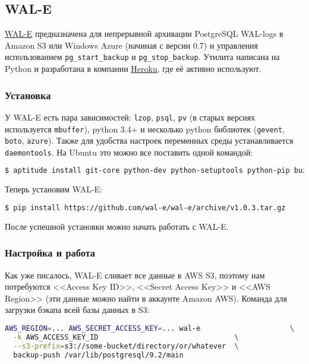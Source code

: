 \subsection{WAL-E}

\href{https://github.com/wal-e/wal-e}{WAL-E} предназначена для непрерывной архивации PostgreSQL WAL-logs в Amazon S3 или Windows Azure (начиная с версии 0.7) и управления использованием \lstinline!pg_start_backup! и \lstinline!pg_stop_backup!. Утилита написана на Python и разработана в компании \href{http://www.heroku.com/}{Heroku}, где её активно используют.


\subsubsection{Установка}

У WAL-E есть пара зависимостей: \lstinline!lzop!, \lstinline!psql!, \lstinline!pv! (в старых версиях используется \lstinline!mbuffer!), python 3.4+ и несколько python библиотек (\lstinline!gevent!, \lstinline!boto!, \lstinline!azure!). Также для удобства настроек переменных среды устанавливается \lstinline!daemontools!. На Ubuntu это можно все поставить одной командой:

\begin{lstlisting}[language=Bash,label=lst:wal-e1,caption=Установка зависимостей для WAL-E]
$ aptitude install git-core python-dev python-setuptools python-pip build-essential libevent-dev lzop pv daemontools daemontools-run
\end{lstlisting}

Теперь установим WAL-E:

\begin{lstlisting}[language=Bash,label=lst:wal-e2,caption=Установка WAL-E]
$ pip install https://github.com/wal-e/wal-e/archive/v1.0.3.tar.gz
\end{lstlisting}

После успешной установки можно начать работать с WAL-E.

\subsubsection{Настройка и работа}

Как уже писалось, WAL-E сливает все данные в AWS S3, поэтому нам потребуются <<Access Key ID>>, <<Secret Access Key>> и <<AWS Region>> (эти данные можно найти в аккаунте Amazon AWS). Команда для загрузки бэкапа всей базы данных в S3:

\begin{lstlisting}[language=Bash,label=lst:wal-e3,caption=Загрузка бэкапа всей базы данных в S3]
AWS_REGION=... AWS_SECRET_ACCESS_KEY=... wal-e                     \
  -k AWS_ACCESS_KEY_ID                                \
  --s3-prefix=s3://some-bucket/directory/or/whatever  \
  backup-push /var/lib/postgresql/9.2/main
\end{lstlisting}

